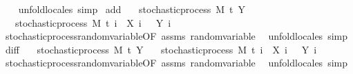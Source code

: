 \begin{isabellebody}
%
\isadelimproof
\ \ %
\endisadelimproof
%
\isatagproof
{}\isamarkupfalse%
\ {\isacharparenleft}{\kern0pt}unfold{\isacharunderscore}{\kern0pt}locales{\isacharparenright}{\kern0pt}\ simp%
\endisatagproof
{\isafoldproof}%
%
\isadelimproof
\isanewline
%
\endisadelimproof
\isanewline
{}\isamarkupfalse%
\ add{\isacharcolon}{\kern0pt}\isanewline
\ \ \ {\isachardoublequoteopen}stochastic{\isacharunderscore}{\kern0pt}process\ M\ t\ Y{\isachardoublequoteclose}\isanewline
\ \ \ {\isachardoublequoteopen}stochastic{\isacharunderscore}{\kern0pt}process\ M\ t\ {\isacharparenleft}{\kern0pt}{\isasymlambda}i\ {\isasymxi}{\isachardot}{\kern0pt}\ X\ i\ {\isasymxi}\ {\isacharplus}{\kern0pt}\ Y\ i\ {\isasymxi}{\isacharparenright}{\kern0pt}{\isachardoublequoteclose}\isanewline
%
\isadelimproof
\ \ %
\endisadelimproof
%
\isatagproof
{}\isamarkupfalse%
\ stochastic{\isacharunderscore}{\kern0pt}process{\isachardot}{\kern0pt}random{\isacharunderscore}{\kern0pt}variable{\isacharbrackleft}{\kern0pt}OF\ assms{\isacharbrackright}{\kern0pt}\ random{\isacharunderscore}{\kern0pt}variable\ \isamarkupfalse%
\ {\isacharparenleft}{\kern0pt}unfold{\isacharunderscore}{\kern0pt}locales{\isacharparenright}{\kern0pt}\ simp%
\endisatagproof
{\isafoldproof}%
%
\isadelimproof
\isanewline
%
\endisadelimproof
\isanewline
{}\isamarkupfalse%
\ diff{\isacharcolon}{\kern0pt}\isanewline
\ \ \ {\isachardoublequoteopen}stochastic{\isacharunderscore}{\kern0pt}process\ M\ t\ Y{\isachardoublequoteclose}\isanewline
\ \ \ {\isachardoublequoteopen}stochastic{\isacharunderscore}{\kern0pt}process\ M\ t\ {\isacharparenleft}{\kern0pt}{\isasymlambda}i\ {\isasymxi}{\isachardot}{\kern0pt}\ X\ i\ {\isasymxi}\ {\isacharminus}{\kern0pt}\ Y\ i\ {\isasymxi}{\isacharparenright}{\kern0pt}{\isachardoublequoteclose}\isanewline
%
\isadelimproof
\ \ %
\endisadelimproof
%
\isatagproof
{}\isamarkupfalse%
\ stochastic{\isacharunderscore}{\kern0pt}process{\isachardot}{\kern0pt}random{\isacharunderscore}{\kern0pt}variable{\isacharbrackleft}{\kern0pt}OF\ assms{\isacharbrackright}{\kern0pt}\ random{\isacharunderscore}{\kern0pt}variable\ \isamarkupfalse%
\ {\isacharparenleft}{\kern0pt}unfold{\isacharunderscore}{\kern0pt}locales{\isacharparenright}{\kern0pt}\ simp%
\endisatagproof
{\isafoldproof}%
%
\isadelimproof
\isanewline
%
\endisadelimproof
\isanewline

\end{isabellebody}

